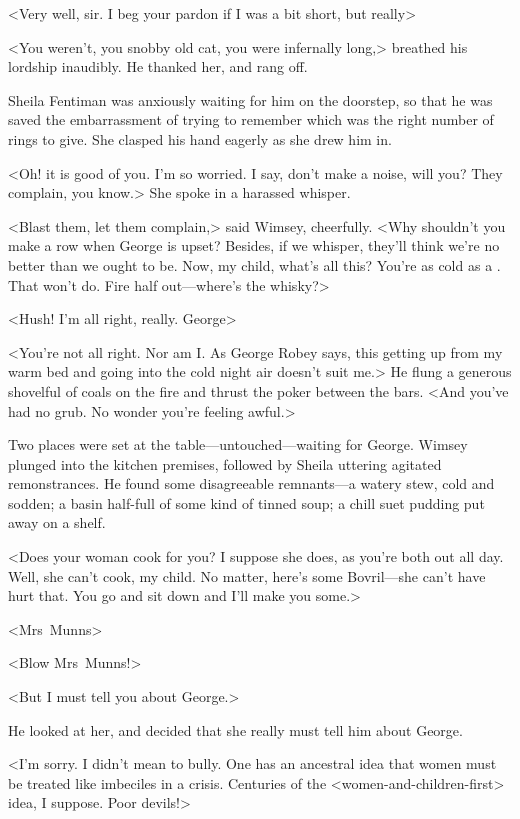 <Very well, sir. I beg your pardon if I was a bit short, but really\longdash>

<You weren't, you snobby old cat, you were infernally long,> breathed his lordship inaudibly. He thanked her, and rang off.

Sheila Fentiman was anxiously waiting for him on the doorstep, so that he was saved the embarrassment of trying to remember which was the right number of rings to give. She clasped his hand eagerly as she drew him in.

<Oh! it is good of you. I'm so worried. I say, don't make a noise, will you? They complain, you know.> She spoke in a harassed whisper.

<Blast them, let them complain,> said Wimsey, cheerfully. <Why shouldn't you make a row when George is upset? Besides, if we whisper, they'll think we're no better than we ought to be. Now, my child, what's all this? You're as cold as a . That won't do. Fire half out—where's the whisky?>

<Hush! I'm all right, really. George\longdash>

<You're not all right. Nor am I\@. As George Robey says, this getting up from my warm bed and going into the cold night air doesn't suit me.> He flung a generous shovelful of coals on the fire and thrust the poker between the bars. <And you've had no grub. No wonder you're feeling awful.>

Two places were set at the table—untouched—waiting for George. Wimsey plunged into the kitchen premises, followed by Sheila uttering agitated remonstrances. He found some disagreeable remnants—a watery stew, cold and sodden; a basin half-full of some kind of tinned soup; a chill suet pudding put away on a shelf.

<Does your woman cook for you? I suppose she does, as you're both out all day. Well, she can't cook, my child. No matter, here's some Bovril—she can't have hurt that. You go and sit down and I'll make you some.>

<Mrs~Munns\longdash>

<Blow Mrs~Munns!>

<But I must tell you about George.>

He looked at her, and decided that she really must tell him about George.

<I'm sorry. I didn't mean to bully. One has an ancestral idea that women must be treated like imbeciles in a crisis. Centuries of the <women-and-children-first> idea, I suppose. Poor devils!>

